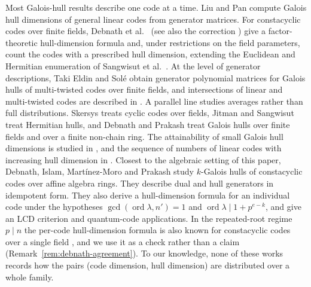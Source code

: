 \documentclass[preprint,12pt,a4paper]{elsarticle}
\theoremstyle{definition}
\theoremstyle{remark}
\begin{document}
Most Galois-hull results describe one code at a time. Liu and Pan
\cite{liuPan2020} compute Galois hull dimensions of general linear codes from
generator matrices. For constacyclic codes over finite fields, Debnath et
al.\ \cite{debnathConstacyclic2023} (see also the correction
\cite{debnathCorrection2023}) give a factor-theoretic hull-dimension
formula and, under restrictions on the field parameters, count the codes
with a prescribed hull dimension, extending the Euclidean and Hermitian
enumeration of Sangwisut et al.\ \cite{sangwisut2015}. At the level of
generator descriptions, Taki Eldin and Sol\'e \cite{eldinSole2026} obtain
generator polynomial matrices for Galois hulls of multi-twisted codes over
finite fields, and intersections of linear and multi-twisted codes are
described in \cite{eldinLeroy2026}. A parallel line studies averages rather than full
distributions. Skersys \cite{skersys2003} treats cyclic codes over fields,
Jitman and Sangwisut \cite{jitmanSangwisut2018} treat Hermitian hulls, and
Debnath and Prakash \cite{debnathAverage2025} treat Galois hulls over finite
fields and over a finite non-chain ring. The attainability of small Galois
hull dimensions is studied in \cite{debnathSmall2026}, and the sequence of
numbers of linear codes with increasing hull dimension in
\cite{bouyuklieva2026}. Closest to the
algebraic setting of this paper, Debnath, Islam, Mart\'inez-Moro and Prakash
\cite{debnathAffine2026} study $k$-Galois hulls of constacyclic codes over
affine algebra rings. They describe dual and hull generators in idempotent
form. They also derive a hull-dimension formula for an individual code under the
hypotheses $\gcd(\operatorname{ord}\lambda,n')=1$ and
$\operatorname{ord}\lambda\mid 1+p^{e-k}$, and give an LCD criterion and
quantum-code applications. In the repeated-root regime $p\mid n$ the
per-code hull-dimension formula is also known for constacyclic codes over a
single field \cite{debnathConstacyclic2023}, and we use it as a check rather
than a claim (Remark~\ref{rem:debnath-agreement}). To our knowledge, none of
these works records how the pairs (code dimension, hull dimension) are
distributed over a whole family.
\end{document}
